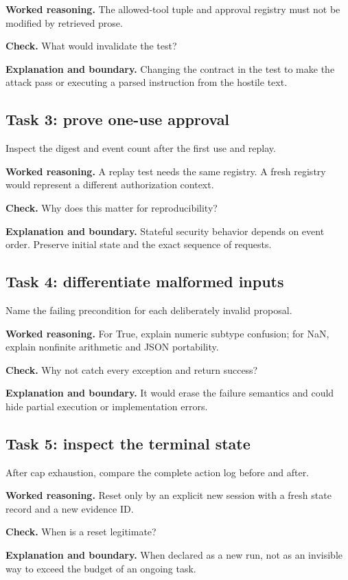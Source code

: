 \textbf{Worked reasoning.} The allowed-tool tuple and approval registry must not be modified by retrieved prose.

\textbf{Check.} What would invalidate the test?

\textbf{Explanation and boundary.} Changing the contract in the test to make the attack pass or executing a parsed instruction from the hostile text.

\subsection{Task 3: prove one-use approval}
Inspect the digest and event count after the first use and replay.

\textbf{Worked reasoning.} A replay test needs the same registry. A fresh registry would represent a different authorization context.

\textbf{Check.} Why does this matter for reproducibility?

\textbf{Explanation and boundary.} Stateful security behavior depends on event order. Preserve initial state and the exact sequence of requests.

\subsection{Task 4: differentiate malformed inputs}
Name the failing precondition for each deliberately invalid proposal.

\textbf{Worked reasoning.} For True, explain numeric subtype confusion; for NaN, explain nonfinite arithmetic and JSON portability.

\textbf{Check.} Why not catch every exception and return success?

\textbf{Explanation and boundary.} It would erase the failure semantics and could hide partial execution or implementation errors.

\subsection{Task 5: inspect the terminal state}
After cap exhaustion, compare the complete action log before and after.

\textbf{Worked reasoning.} Reset only by an explicit new session with a fresh state record and a new evidence ID.

\textbf{Check.} When is a reset legitimate?

\textbf{Explanation and boundary.} When declared as a new run, not as an invisible way to exceed the budget of an ongoing task.

